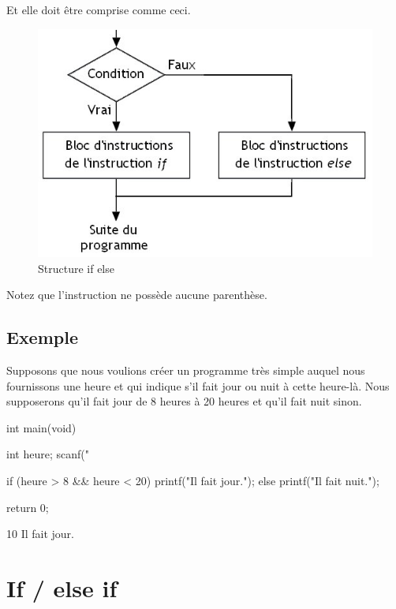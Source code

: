 Et elle doit être comprise comme ceci.

\begin{figure}[htbp]
\centering
\includegraphics[scale=0.4]{images/boucle_if_else.jpg}
\caption{Structure if else}
\end{figure}

\begin{infobox} Notez que l'instruction 
ne possède aucune parenthèse.
\end{infobox}

\subsection{Exemple}
\label{exemple-3}

Supposons que nous voulions créer un programme très simple auquel nous
fournissons une heure et qui indique s'il fait jour ou nuit à cette
heure-là. Nous supposerons qu'il fait jour de 8 heures à 20 heures et
qu'il fait nuit sinon.

\begin{C}
int main(void)
{
    int heure;
    scanf("%

    if (heure > 8 && heure < 20)
    {
        printf("Il fait jour.\n");
    }
    else
    {
        printf("Il fait nuit.\n");
    }

    return 0;
}
\end{C}

\begin{C}
10
Il fait jour.
\end{C}

\section{If / else if}
\label{if-else-if}

